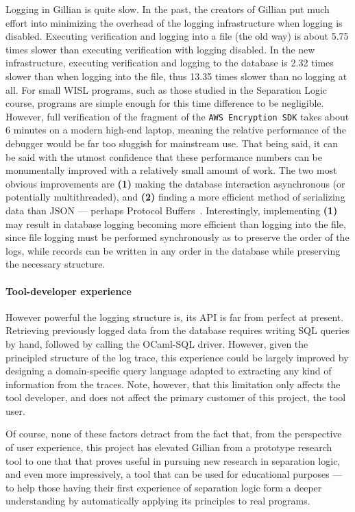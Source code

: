 Logging in Gillian is quite slow. In the past, the creators of Gillian put much
effort into minimizing the overhead of the logging infrastructure when logging
is disabled. Executing verification and logging into a file (the old way) is
about 5.75\footnotemark[1]{} times slower than executing verification with
logging disabled. In the new infrastructure, executing verification and logging
to the database is 2.32\footnotemark[1]{} times slower than when logging into
the file, thus 13.35\footnotemark[1]{} times slower than no logging at all.
For small WISL programs, such as those studied in the Separation Logic course,
programs are simple enough for this time difference to be negligible. However,
full verification of the fragment of the \texttt{AWS Encryption SDK} takes about
6 minutes on a modern high-end laptop, meaning the relative performance of the
debugger would be far too sluggish for mainstream use.  That being said,
it can be said with the utmost confidence that these performance numbers can be
monumentally improved with a relatively small amount of work.
The two most obvious improvements are \textbf{(1)} making the database
interaction asynchronous (or potentially multithreaded), and \textbf{(2)}
finding a more efficient method of serializing data than JSON --- perhaps
Protocol Buffers~\cite{protobuf}. Interestingly, implementing \textbf{(1)} may
result in database logging becoming more efficient than logging into the file,
since file logging must be performed synchronously as to preserve the order of
the logs, while records can be written in any order in the database while
preserving the necessary structure.

\paragraph{Tool-developer experience}
However powerful the logging structure is, its API is far from perfect at
present. Retrieving previously logged data from the database requires writing
SQL queries by hand, followed by calling the OCaml-SQL driver. However, given
the principled structure of the log trace, this experience could be largely
improved by designing a domain-specific query language adapted to extracting any
kind of information from the traces. Note, however, that this limitation only
affects the tool developer, and does not affect the primary customer of this
project, the tool user.

Of course, none of these factors detract from the fact that, from the
perspective of user experience, this project has elevated Gillian from a
prototype research tool to one that that proves useful in pursuing new research
in separation logic, and even more impressively, a tool that can be used for
educational purposes --- to help those having their first experience of
separation logic form a deeper understanding by automatically applying its
principles to real programs.
